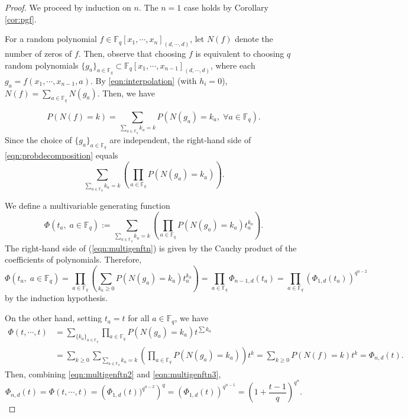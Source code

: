 \documentclass[10pt,a4paper]{amsart}
\newcommand{\FF}{\mathbb{F} }
\begin{document}
\begin{proof}
We proceed by induction on $n$. The $n = 1$ case holds by Corollary \ref{cor:pgf}.

For a random polynomial $f \in \FF_q[x_1, \cdots, x_n]_{(d, \cdots, d)}$, let $N(f)$ denote the number of zeros of $f$. Then, observe that choosing $f$ is equivalent to choosing $q$ random polynomials $\{g_a\}_{a \in \FF_q} \subset \FF_q[x_1, \cdots, x_{n-1}]_{(d, \cdots, d)}$, where each $g_a = f(x_1, \cdots, x_{n-1}, a)$. By \eqref{eqn:interpolation} (with $h_i = 0$), $N(f) = \sum_{a \in \FF_q}N(g_a)$. Then, we have

\begin{equation}\label{eqn:probdecomposition}
    P(N(f) = k) = \sum_{\sum_{a \in \FF_q} k_a =k}P(N(g_a) = k_a, \; \forall a \in \FF_q).
\end{equation}
Since the choice of $\{g_a\}_{a \in \FF_q}$ are independent, the right-hand side of \eqref{eqn:probdecomposition} equals 
\[
    \sum_{\sum_{a \in \FF_q}k_a=k}\left(\prod_{a \in \FF_q}P(N(g_a) = k_a)\right).
\]

We define a multivariable generating function
\begin{equation}\label{eqn:multigenftn}
    \Phi(t_a, \;a \in \FF_q) := 
    \sum_{\sum_{a \in \FF_q}k_a = k} \left(\prod_{a \in \FF_q}P(N(g_a) = k_a)t_a^{k_a}\right).
\end{equation}
The right-hand side of (\ref{eqn:multigenftn}) is given by the Cauchy product of the coefficients of polynomials. Therefore, 
\begin{equation}\label{eqn:multigenftn2}
    \Phi(t_a, \;a \in \FF_q) = 
    \prod_{a \in \FF_q}\left(\sum_{k_a \ge 0} P(N(g_a) = k_a) t_a^{k_a}\right)
    = \prod_{a \in \FF_q}\Phi_{n-1,d}(t_a)
    = \prod_{a \in \FF_q}(\Phi_{1,d}(t_a))^{q^{n-2}}
\end{equation}
by the induction hypothesis. 

On the other hand, setting $t_a = t$ for all $a \in \FF_q$, we have 
\begin{equation}\label{eqn:multigenftn3}
\begin{split}
    \Phi(t, \cdots, t) &= \sum_{\{k_a\}_{a \in \FF_q}}
    \prod_{a \in \FF_q}P(N(g_a) = k_a)t^{\sum k_a}\\
    &= \sum_{k \ge 0}\sum_{\sum_{a \in \FF_q} k_a = k} \left(\prod_{a \in \FF_q}P(N(g_a) = k_a)\right) t^k
    = \sum_{k \ge 0}P(N(f) = k)t^k = \Phi_{n,d}(t).
\end{split}
\end{equation}
Then, combining \eqref{eqn:multigenftn2} and \eqref{eqn:multigenftn3}, 
\[
    \Phi_{n,d}(t) = \Phi(t, \cdots, t) = \left(\Phi_{1,d}(t))^{q^{n-2}}\right)^{q} = (\Phi_{1,d}(t))^{q^{n-1}} = \left(1+\frac{t-1}{q}\right)^{q^n}.
\]
\end{proof}
\end{document}
